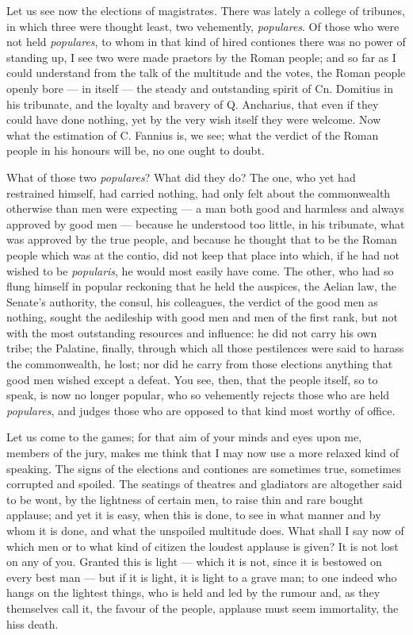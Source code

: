  Let us see now the elections of magistrates. There was lately a college of tribunes, in which three were thought least, two vehemently, \textit{populares}. Of those who were not held \textit{populares}, to whom in that kind of hired contiones there was no power of standing up, I see two were made praetors by the Roman people; and so far as I could understand from the talk of the multitude and the votes, the Roman people openly bore --- in itself --- the steady and outstanding spirit of Cn. Domitius in his tribunate, and the loyalty and bravery of Q. Ancharius, that even if they could have done nothing, yet by the very wish itself they were welcome. Now what the estimation of C. Fannius is, we see; what the verdict of the Roman people in his honours will be, no one ought to doubt.

 What of those two \textit{populares}? What did they do? The one, who yet had restrained himself, had carried nothing, had only felt about the commonwealth otherwise than men were expecting --- a man both good and harmless and always approved by good men --- because he understood too little, in his tribunate, what was approved by the true people, and because he thought that to be the Roman people which was at the contio, did not keep that place into which, if he had not wished to be \textit{popularis}, he would most easily have come. The other, who had so flung himself in popular reckoning that he held the auspices, the Aelian law, the Senate's authority, the consul, his colleagues, the verdict of the good men as nothing, sought the aedileship with good men and men of the first rank, but not with the most outstanding resources and influence: he did not carry his own tribe; the Palatine, finally, through which all those pestilences were said to harass the commonwealth, he lost; nor did he carry from those elections anything that good men wished except a defeat. You see, then, that the people itself, so to speak, is now no longer popular, who so vehemently rejects those who are held \textit{populares}, and judges those who are opposed to that kind most worthy of office.

 Let us come to the games; for that aim of your minds and eyes upon me, members of the jury, makes me think that I may now use a more relaxed kind of speaking. The signs of the elections and contiones are sometimes true, sometimes corrupted and spoiled. The seatings of theatres and gladiators are altogether said to be wont, by the lightness of certain men, to raise thin and rare bought applause; and yet it is easy, when this is done, to see in what manner and by whom it is done, and what the unspoiled multitude does. What shall I say now of which men or to what kind of citizen the loudest applause is given? It is not lost on any of you. Granted this is light --- which it is not, since it is bestowed on every best man --- but if it is light, it is light to a grave man; to one indeed who hangs on the lightest things, who is held and led by the rumour and, as they themselves call it, the favour of the people, applause must seem immortality, the hiss death.

